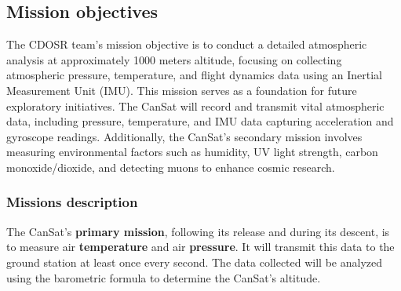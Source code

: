\subsection{Mission objectives}


\vspace{0.5cm}

The CDOSR team's mission objective is to conduct a detailed atmospheric analysis at approximately 1000 meters altitude, focusing on collecting atmospheric pressure, temperature, and flight dynamics data using an Inertial Measurement Unit (IMU). This mission serves as a foundation for future exploratory initiatives. The CanSat will record and transmit vital atmospheric data, including pressure, temperature, and IMU data capturing acceleration and gyroscope readings. Additionally, the CanSat's secondary mission involves measuring environmental factors such as humidity, UV light strength, carbon monoxide/dioxide, and detecting muons to enhance cosmic research.

\subsubsection{Missions description}

The CanSat's \textbf{primary mission}, following its release and during its descent, is to measure air \textbf{temperature} and air \textbf{pressure}. It will transmit this data to the ground station at least once every second. The data collected will be analyzed using the barometric formula to determine the CanSat's altitude.

